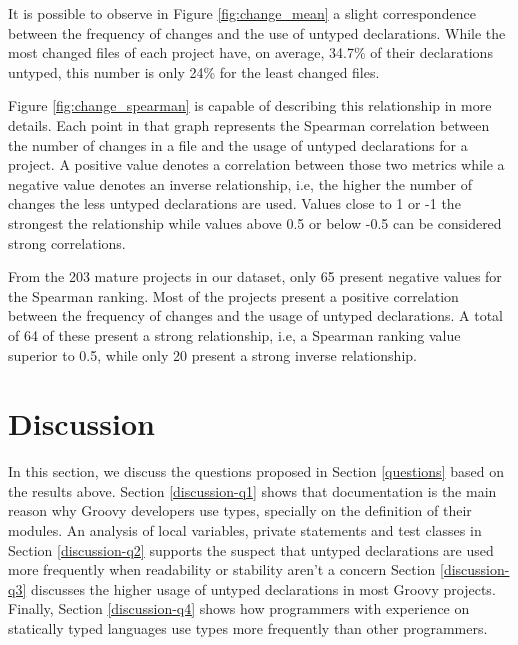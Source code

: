 \documentclass[preprint]{sigplanconf}
\begin{document}
It is possible to observe in Figure \ref{fig:change_mean} a slight correspondence between the frequency of changes and the use of untyped declarations.
While the most changed files of each project have, on average, 34.7\% of their declarations untyped, this number is only 24\% for the least changed files.

Figure \ref{fig:change_spearman} is capable of describing this relationship in more details.
Each point in that graph represents the Spearman correlation between the number of changes in a file and the usage of untyped declarations for a project. 
A positive value denotes a correlation between those two metrics while a negative value denotes an inverse relationship, i.e, the higher the number of changes the less untyped declarations are used.
Values close to 1 or -1 the strongest the relationship while values above 0.5 or below -0.5 can be considered strong correlations.

From the 203 mature projects in our dataset, only 65 present negative values for the Spearman ranking. 
Most of the projects present a positive correlation between the frequency of changes and the usage of untyped declarations.
A total of 64 of these present a strong relationship, i.e, a Spearman ranking value superior to 0.5, while only 20 present a strong inverse relationship.



















%
%
\section{Discussion\label{discussion}}

In this section, we discuss the questions proposed in Section \ref{questions} based on the results above.
Section \ref{discussion-q1} shows that documentation is the main reason why Groovy developers use types, specially on the definition of their modules.
An analysis of local variables, private statements and test classes in Section \ref{discussion-q2} supports the suspect that untyped declarations are used more frequently when readability or stability aren't a concern
Section \ref{discussion-q3} discusses the higher usage of untyped declarations in most Groovy projects.
Finally, Section \ref{discussion-q4} shows how programmers with experience on statically typed languages use types more frequently than other programmers.
\end{document}
